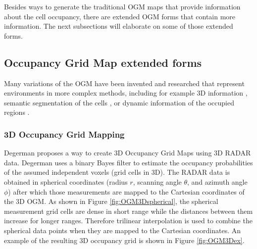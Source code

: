 Besides ways to generate the traditional \gls{OGM} maps that provide information about the cell occupancy, there are extended \gls{OGM} forms that contain more information. The next subsections will elaborate on some of those extended forms.


\subsection{Occupancy Grid Map extended forms} \label{subsec:OGM_ext_form}
Many variations of the \gls{OGM} have been invented and researched that represent environments in more complex methods, including for example 3D information \cite{degerman20163d}, semantic segmentation of the cells \cite{lu2019monocular}, or dynamic information of the occupied regions \cite{nuss2018random}. 

\subsubsection{3D Occupancy Grid Mapping}
Degerman \cite{degerman20163d} proposes a way to create 3D Occupancy Grid Maps using 3D RADAR data. Degerman uses a binary Bayes filter to estimate the occupancy probabilities of the assumed independent voxels (grid cells in 3D). The RADAR data is obtained in spherical coordinates (radius $r$, scanning angle $\theta$, and azimuth angle $\phi$) after which those measurements are mapped to the Cartesian coordinates of the 3D \gls{OGM}. As shown in Figure \ref{fig:OGM3Dspherical}, the spherical measurement grid cells are dense in short range while the distances between them increase for longer ranges. Therefore trilinear interpolation is used to combine the spherical data points when they are mapped to the Cartesian coordinates. An example of the resulting 3D occupancy grid is shown in Figure \ref{fig:OGM3Dex}.


